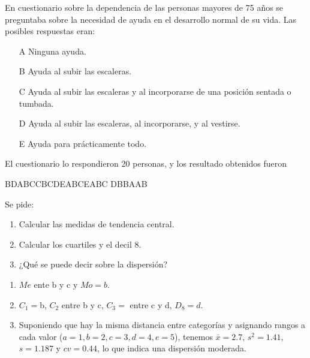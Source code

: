 {En cuestionario sobre la dependencia de las personas mayores de 75 años se preguntaba sobre la necesidad de ayuda en el desarrollo normal de su vida. Las posibles respuestas eran:
\begin{enumerate}
\item[A] Ninguna ayuda.
\item[B] Ayuda al subir las escaleras.
\item[C] Ayuda al subir las escaleras y al incorporarse de una posición sentada o tumbada.
\item[D] Ayuda al subir las escaleras, al incorporarse, y al vestirse.
\item[E] Ayuda para prácticamente todo.
\end{enumerate}
El cuestionario lo respondieron 20 personas, y los resultado obtenidos fueron
\begin{center}
B\quad D\quad A\quad B\quad C\quad C\quad B\quad C\quad D\quad E\quad A\quad B\quad C\quad E\quad A\quad B\quad C\quad
D\quad B\quad B\quad A\quad A\quad B 
\end{center}
Se pide:
\begin{enumerate}
\item Calcular las medidas de tendencia central.
\item Calcular los cuartiles y el decil 8.
\item ¿Qué se puede decir sobre la dispersión?
\end{enumerate}
}
{\begin{enumerate}
\item $Me$ ente b y c y $Mo=b$. 
\item $C_1=$b, $C_2$ entre b y c, $C_3=$ entre c y d, $D_8=d$.
\item Suponiendo que hay la misma distancia entre categorías y asignando rangos a cada valor ($a=1,b=2,c=3,d=4,e=5$), tenemos $\bar x=2.7$, $s^2=1.41$, $s=1.187$ y $cv=0.44$, lo que indica una dispersión moderada. 
\end{enumerate}
}
{}


